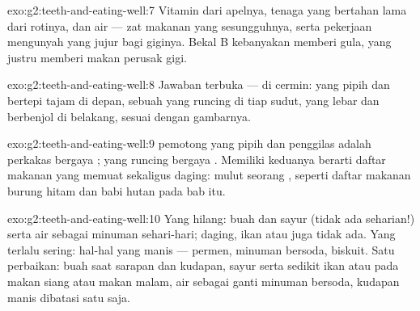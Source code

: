 \begin{solution}{exo:g2:teeth-and-eating-well:7}
Vitamin dari apelnya, tenaga yang bertahan lama dari rotinya, dan air
--- zat makanan yang sesungguhnya, serta pekerjaan mengunyah yang
jujur bagi giginya. Bekal B kebanyakan memberi gula, yang justru
memberi makan  perusak gigi.
\end{solution}

\begin{solution}{exo:g2:teeth-and-eating-well:8}
Jawaban terbuka --- di cermin:  yang pipih dan bertepi tajam
di depan, sebuah  yang runcing di tiap sudut, 
yang lebar dan berbenjol di belakang, sesuai dengan gambarnya.
\end{solution}

\begin{solution}{exo:g2:teeth-and-eating-well:9}
 pemotong yang pipih dan  penggilas adalah
perkakas bergaya ;  yang runcing bergaya
. Memiliki keduanya berarti daftar makanan yang memuat
 sekaligus daging: mulut seorang , seperti daftar
makanan burung hitam dan babi hutan pada bab itu.
\end{solution}

\begin{solution}{exo:g2:teeth-and-eating-well:10}
Yang hilang: buah dan sayur (tidak ada seharian!) serta air sebagai
minuman sehari-hari; daging, ikan atau  juga tidak ada. Yang
terlalu sering: hal-hal yang manis --- permen, minuman bersoda,
biskuit. Satu perbaikan: buah saat sarapan dan kudapan, sayur serta
sedikit ikan atau  pada makan siang atau makan malam, air sebagai
ganti minuman bersoda, kudapan manis dibatasi satu saja.
\end{solution}
